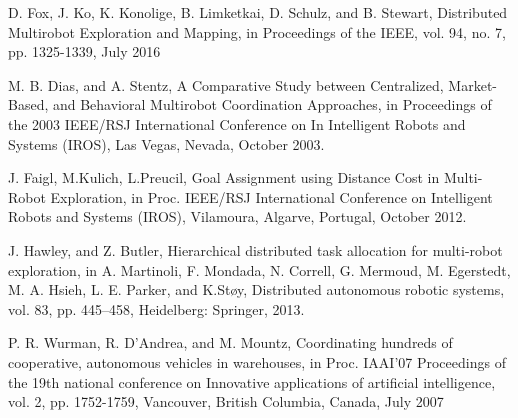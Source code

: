 \documentclass[letterpaper, 10 pt, conference]{ieeeconf}  %
\begin{document}
\begin{thebibliography}{99}
 D. Fox, J. Ko, K. Konolige, B. Limketkai, D. Schulz, and B. Stewart, Distributed Multirobot Exploration and Mapping, in Proceedings of the IEEE, vol. 94, no. 7, pp. 1325-1339, July 2016

 M. B. Dias, and A. Stentz, A Comparative Study between Centralized, Market-Based, and Behavioral Multirobot Coordination Approaches, in Proceedings of the 2003 IEEE/RSJ  International Conference on In Intelligent Robots and Systems (IROS), Las Vegas, Nevada, October 2003.

 J. Faigl, M.Kulich, L.Preucil, Goal Assignment using Distance Cost in Multi-Robot Exploration, in Proc. IEEE/RSJ  International Conference on Intelligent Robots and Systems (IROS), Vilamoura, Algarve, Portugal, October 2012.

 J. Hawley, and Z. Butler, Hierarchical distributed task allocation for multi-robot exploration, in A. Martinoli, F. Mondada, N. Correll, G. Mermoud, M. Egerstedt, M. A. Hsieh, L. E. Parker, and K.Støy, Distributed autonomous robotic systems, vol. 83, pp. 445–458, Heidelberg: Springer, 2013.

 P. R. Wurman, R. D'Andrea, and M. Mountz, Coordinating hundreds of cooperative, autonomous vehicles in warehouses, in Proc. IAAI'07 Proceedings of the 19th national conference on Innovative applications of artificial intelligence, vol. 2, pp. 1752-1759, Vancouver, British Columbia, Canada, July 2007


\end{thebibliography}
\end{document}
